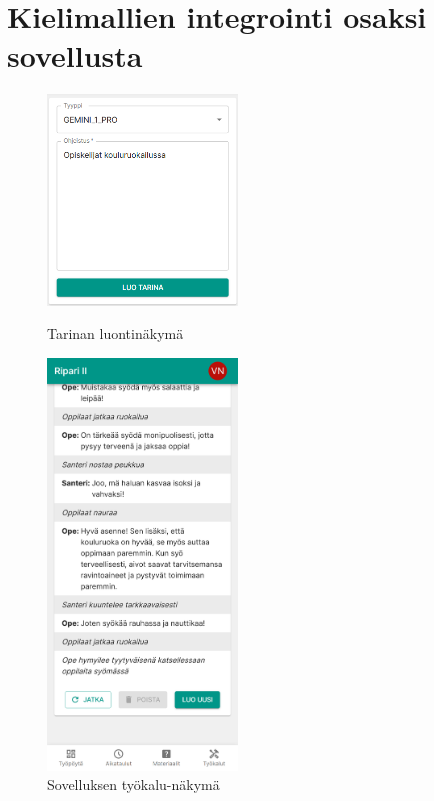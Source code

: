 \clearpage
\section{Kielimallien integrointi osaksi sovellusta}

\begin{figure}
    \centering
    \includegraphics[width=0.45\textwidth]{figures/isosapp-tyokalut-tarinan-generointi-1.png}
    \caption{Tarinan luontinäkymä}
    \label{fig:isosapp-tyokalut-tarinan-generointi-1}

    \qquad

    \includegraphics[width=0.45\textwidth]{figures/isosapp-tyokalut-tarinan-generointi-2.png}
    \caption{Sovelluksen työkalu-näkymä}
    \label{fig:isosapp-tyokalut-tarinan-generointi-2}
\end{figure}

